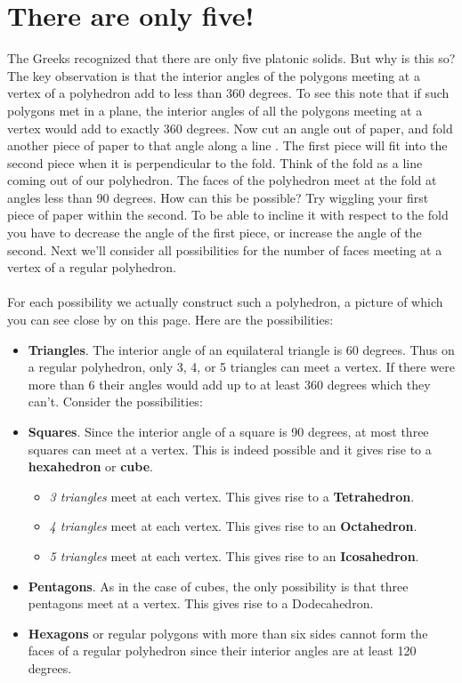 \documentclass[openany,a4paper,12pt]{book}
\begin{document}
\section{There are only five!}
The Greeks recognized that there are only five platonic solids. But why is this so? The key observation is that the interior angles of the polygons meeting at a vertex of a polyhedron add to less than 360 degrees. To see this note that if such polygons met in a plane, the interior angles of all the polygons meeting at a vertex would add to exactly 360 degrees. Now cut an angle out of paper, and fold another piece of paper to that angle along a line \cite{smith96:2}. The first piece will fit into the second piece when it is perpendicular to the fold. Think of the fold as a line coming out of our polyhedron. The faces of the polyhedron meet at the fold at angles less than 90 degrees. How can this be possible? Try wiggling your first piece of paper within the second. To be able to incline it with respect to the fold you have to decrease the angle of the first piece, or increase the angle of the second. Next we'll consider all possibilities for the number of faces meeting at a vertex of a regular polyhedron.  \\\\
For each possibility we actually construct such a polyhedron, a picture of which you can see close by on this page. Here are the possibilities: 
\begin{itemize}
\item
\textbf{Triangles}. The interior angle of an equilateral triangle is 60 degrees. Thus on a regular polyhedron, only 3, 4, or 5 triangles can meet a vertex. If there were more than 6 their angles would add up to at least 360 degrees which they can't. Consider the possibilities: 
\item
\textbf{Squares}. Since the interior angle of a square is 90 degrees, at most three squares can meet at a vertex. This is indeed possible and it gives rise to a \textbf{hexahedron} or \textbf{cube}.
\begin{itemize}
\item[\Checkmark]
\textit{3 triangles} meet at each vertex. This gives rise to a \textbf{Tetrahedron}.
\item[\Checkmark]
\textit{4 triangles} meet at each vertex. This gives rise to an \textbf{Octahedron}.
\item[\Checkmark]
\textit{5 triangles} meet at each vertex. This gives rise to an \textbf{Icosahedron}.
\end{itemize}
\item
 \textbf{Pentagons}. As in the case of cubes, the only possibility is that three pentagons meet at a vertex. This gives rise to a Dodecahedron.
\item
 \textbf{Hexagons} or regular polygons with more than six sides cannot form the faces of a regular polyhedron since their interior angles are at least 120 degrees.
 \end{itemize}
\end{document}
